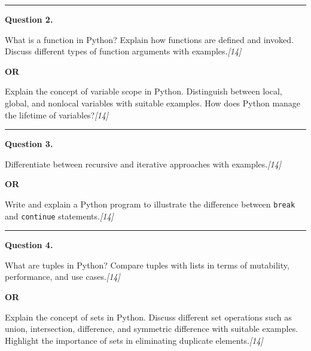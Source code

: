 \documentclass[11pt,a4paper]{article}
\newcommand{\pts}[1]{\hfill   \textit{[#1]}}
\begin{document}
\medskip\rule{\linewidth}{0.2pt}\medskip




\noindent   \textbf{Question 2.}

\begin{parts}
  \item What is a function in Python? Explain how functions are defined and invoked. Discuss different types of function arguments with examples.\pts{14}
\end{parts}
\centerline{   \textbf{OR}}

\begin{parts}
  \item Explain the concept of variable scope in Python. Distinguish between local, global, and nonlocal variables with suitable examples. How does Python manage the lifetime of variables?\pts{14}
\end{parts}

\medskip\rule{\linewidth}{0.2pt}\medskip




\noindent   \textbf{Question 3.}

\begin{parts}
  \item Differentiate between recursive and iterative approaches with examples.\pts{14}
\end{parts}
\centerline{   \textbf{OR}}

\begin{parts}
  \item Write and explain a Python program to illustrate the difference between   \texttt{break} and   \texttt{continue} statements.\pts{14}
\end{parts}

\medskip\rule{\linewidth}{0.2pt}\medskip




\noindent   \textbf{Question 4.}

\begin{parts}
  \item What are tuples in Python? Compare tuples with lists in terms of mutability, performance, and use cases.\pts{14}
\end{parts}
\centerline{   \textbf{OR}}

\begin{parts}
  \item Explain the concept of sets in Python. Discuss different set operations such as union, intersection, difference, and symmetric difference with suitable examples. Highlight the importance of sets in eliminating duplicate elements.\pts{14}
\end{parts}
\end{document}
